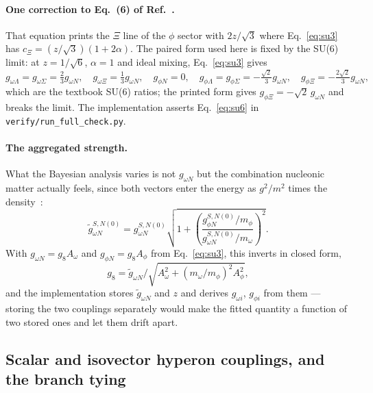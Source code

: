 \documentclass[aps,prc,onecolumn,superscriptaddress,nofootinbib,10pt]{revtex4-2}
\begin{document}
\paragraph{One correction to Eq.~(6) of Ref.~\cite{Frohaug2025}.} That equation
prints the $\Xi$ line of the $\phi$ sector with $2z/\sqrt{3}$ where
Eq.~\eqref{eq:su3} has $c_\Xi = (z/\sqrt{3})(1+2\alpha)$. The paired form used
here is fixed by the SU(6) limit: at $z = 1/\sqrt{6}$, $\alpha = 1$ and ideal
mixing, Eq.~\eqref{eq:su3} gives
\begin{equation}
  g_{\omega\Lambda} = g_{\omega\Sigma} = \tfrac{2}{3} g_{\omega N}, \quad
  g_{\omega\Xi} = \tfrac{1}{3} g_{\omega N}, \quad
  g_{\phi N} = 0, \quad
  g_{\phi\Lambda} = g_{\phi\Sigma} = -\tfrac{\sqrt{2}}{3} g_{\omega N}, \quad
  g_{\phi\Xi} = -\tfrac{2\sqrt{2}}{3} g_{\omega N},
  \label{eq:su6}
\end{equation}
which are the textbook SU(6) ratios; the printed form gives
$g_{\phi\Xi} = -\sqrt{2}\, g_{\omega N}$ and breaks the limit. The
implementation asserts Eq.~\eqref{eq:su6} in \texttt{verify/run\_full\_check.py}.

\paragraph{The aggregated strength.} What the Bayesian analysis varies is not
$g_{\omega N}$ but the combination nucleonic matter actually feels, since both
vectors enter the energy as $g^2/m^2$ times the density~\cite{Frohaug2025}:
\begin{equation}
  \tilde{g}^{S,N(0)}_{\omega N} = g^{S,N(0)}_{\omega N}
    \sqrt{1 + \left(\frac{g^{S,N(0)}_{\phi N}/m_\phi}
                         {g^{S,N(0)}_{\omega N}/m_\omega}\right)^2 } .
  \label{eq:aggregate}
\end{equation}
With $g_{\omega N} = g_8 A_\omega$ and $g_{\phi N} = g_8 A_\phi$ from
Eq.~\eqref{eq:su3}, this inverts in closed form,
\begin{equation}
  g_8 = \tilde{g}_{\omega N} \Big/
        \sqrt{A_\omega^2 + (m_\omega/m_\phi)^2 A_\phi^2} ,
  \label{eq:g8}
\end{equation}
and the implementation stores $\tilde{g}_{\omega N}$ and $z$ and derives
$g_{\omega i}$, $g_{\phi i}$ from them --- storing the two couplings separately
would make the fitted quantity a function of two stored ones and let them drift
apart.

\subsection{Scalar and isovector hyperon couplings, and the branch tying}
\end{document}
